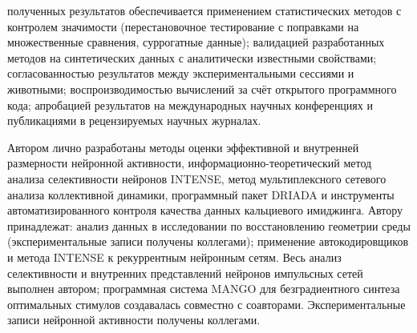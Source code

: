 {\reliability} полученных результатов обеспечивается применением статистических
методов с контролем значимости (перестановочное тестирование с поправками
на множественные сравнения, суррогатные данные); валидацией разработанных
методов на синтетических данных с аналитически известными свойствами;
согласованностью результатов между экспериментальными сессиями и животными;
воспроизводимостью вычислений за счёт открытого программного кода; апробацией
результатов на международных научных конференциях и публикациями
в рецензируемых научных журналах.




{\contribution} Автором лично разработаны методы оценки эффективной
и внутренней размерности нейронной активности, информационно-теоретический
метод анализа селективности нейронов INTENSE, метод мультиплексного сетевого
анализа коллективной динамики, программный пакет DRIADA и инструменты
автоматизированного контроля качества данных кальциевого имиджинга. Автору
принадлежат: анализ данных в исследовании по восстановлению геометрии среды
(экспериментальные записи получены коллегами); применение автокодировщиков
и метода INTENSE к рекуррентным нейронным сетям. Весь анализ селективности
и внутренних представлений нейронов импульсных сетей выполнен автором;
программная система MANGO для безградиентного синтеза оптимальных стимулов
создавалась совместно с соавторами. Экспериментальные записи нейронной активности
получены коллегами.


